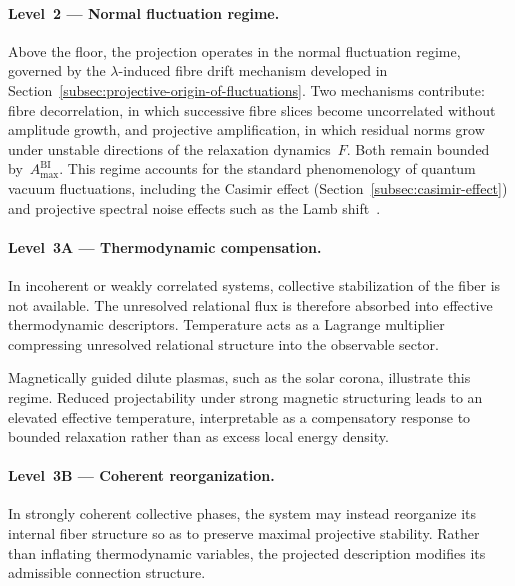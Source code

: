   \paragraph{Level~2 --- Normal fluctuation regime.}

    Above the floor, the projection operates in the normal fluctuation regime, governed
    by the $\lambda$-induced fibre drift mechanism developed in
    Section~\ref{subsec:projective-origin-of-fluctuations}.
    Two mechanisms contribute: fibre decorrelation, in which successive fibre slices
    become uncorrelated without amplitude growth, and projective amplification, in which
    residual norms grow under unstable directions of the relaxation dynamics~$F$.
    Both remain bounded by~$A^{\mathrm{BI}}_{\max}$.
    This regime accounts for the standard phenomenology of quantum vacuum fluctuations,
    including the Casimir effect (Section~\ref{subsec:casimir-effect})
    and projective spectral noise effects such as the Lamb shift~\cite{Beau2026f}.

  \paragraph{Level~3A --- Thermodynamic compensation.}

    In incoherent or weakly correlated systems,
    collective stabilization of the fiber is not available.
    The unresolved relational flux is therefore absorbed into
    effective thermodynamic descriptors.
    Temperature acts as a Lagrange multiplier compressing
    unresolved relational structure into the observable sector.

    Magnetically guided dilute plasmas, such as the solar corona, illustrate this regime.
    Reduced projectability under strong magnetic structuring
    leads to an elevated effective temperature,
    interpretable as a compensatory response to bounded relaxation
    rather than as excess local energy density.

  \paragraph{Level~3B --- Coherent reorganization.}

    In strongly coherent collective phases,
    the system may instead reorganize its internal fiber structure
    so as to preserve maximal projective stability.
    Rather than inflating thermodynamic variables,
    the projected description modifies its admissible connection structure.


